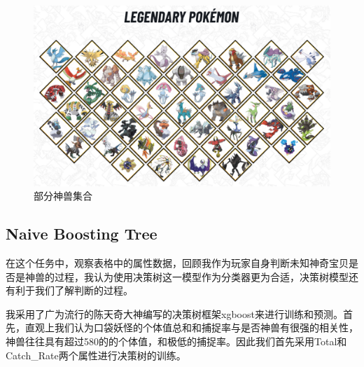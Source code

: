 \documentclass[a4paper, cs4size, oneside]{article}
\begin{document}
\begin{figure}[!htb]
\begin{center}
\includegraphics[width=0.7\linewidth]{figures/legendary.png}
\end{center}
   \caption{部分神兽集合}
\label{fig:legendary}
\end{figure}

\subsection{Naive Boosting Tree}

在这个任务中，观察表格中的属性数据，回顾我作为玩家自身判断未知神奇宝贝是否是神兽的过程，我认为使用决策树这一模型作为分类器更为合适，决策树模型还有利于我们了解判断的过程。

我采用了广为流行的陈天奇大神编写的决策树框架xgboost来进行训练和预测。首先，直观上我们认为口袋妖怪的个体值总和和捕捉率与是否神兽有很强的相关性，神兽往往具有超过580的的个体值，和极低的捕捉率。因此我们首先采用Total和Catch\_Rate两个属性进行决策树的训练。
\end{document}
